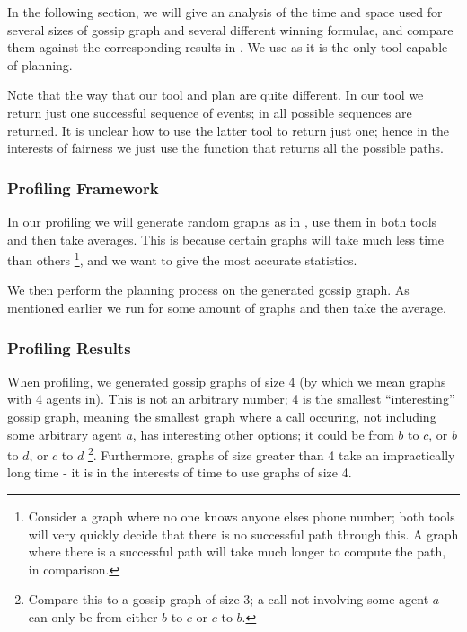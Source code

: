 \documentclass[12pt, a4paper]{article}
\begin{document}
In the following section, we will give an analysis of the time and space used
for several sizes of gossip graph and several different winning formulae, and
compare them against the corresponding results in \cite{GithubGossip}. We use
\cite{GithubGossip} as it is the only tool capable of planning.

Note that the way that our tool and \cite{GithubGossip} plan are quite
different. In our tool we return just one successful sequence of events; in
\cite{GithubGossip} all possible sequences are returned. It is unclear how to
use the latter tool to return just one; hence in the interests of fairness we
just use the function that returns all the possible paths.


\subsubsection{Profiling Framework}

In our profiling we will generate random graphs as in
, use them in both tools and then take averages.
This is because certain graphs will take much less time than others
\footnote{Consider a graph where no one knows anyone elses phone number; both
  tools will very quickly decide that there is no successful path through this.
  A graph where there is a successful path will take much longer to compute the
  path, in comparison.}, and we want to give the most accurate statistics.

We then perform the planning process on the generated gossip graph. As mentioned
earlier we run for some amount of graphs and then take the average.

\subsubsection{Profiling Results}

When profiling, we generated gossip graphs of size 4 (by which we mean graphs
with 4 agents in). This is not an arbitrary number; 4 is the smallest
``interesting'' gossip graph, meaning the smallest graph where a call occuring,
not including some arbitrary agent $a$, has interesting other options; it could
be from $b$ to $c$, or $b$ to $d$, or $c$ to $d$ \footnote{Compare this to a
  gossip graph of size 3; a call not involving some agent $a$ can only be from
  either $b$ to $c$ or $c$ to $b$.}. Furthermore, graphs of size greater than 4
take an impractically long time - it is in the interests of time to use graphs
of size 4.
\end{document}
